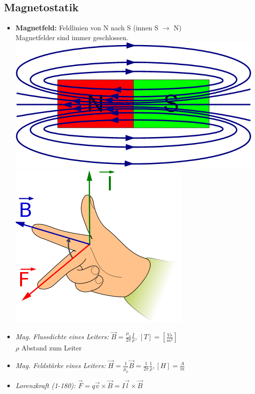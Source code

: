 \documentclass[a4paper, 6pt, landscape]{scrartcl}
\newcommand{\dis}[1]{\hspace{#1cm}}
\begin{document}
\begin{multicols*}{4}
			\section{Magnetostatik}
			\begin{itemize}
				\item \textbf{Magnetfeld:} Feldlinien von N nach S (innen S $\rightarrow$ N)\\
				Magnetfelder sind immer geschlossen.\\
				\includegraphics[scale=0.15]{source/magnet.png}\dis{1}
				\includegraphics[scale=0.18]{source/rightHand.png}
				\item \textit{Mag. Flussdichte eines Leiters:} $\vec{B}=\frac{\mu_o}{2\pi}\frac{I}{\rho}, \, [T]=[\frac{Vs}{m^2}]$\\
				$\rho$ Abstand zum Leiter
				\item \textit{Mag. Feldstärke eines Leiters:} $\vec{H}=\frac{1}{\mu_0}\vec{B}=\frac{1}{2\pi}\frac{1}{\rho},[H]=\frac{A}{m}$
				\item \textit{Lorenzkraft (1-180):} $\vec{F}=q\vec{v}\times\vec{B}=I\vec{l}\times\vec{B}$

\end{itemize}
\end{multicols*}
\end{document}
